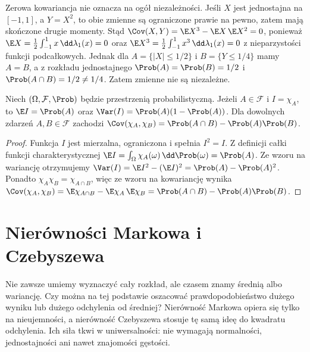 \begin{uwaga}
Zerowa kowariancja nie oznacza na ogół niezależności.
Jeśli $X$ jest jednostajna na $[-1,1]$, a $Y=X^2$, to
obie zmienne są ograniczone prawie na pewno, zatem mają
skończone drugie momenty. Stąd
$\Cov(X,Y)=\E X^3-\E X\,\E X^2=0$,
ponieważ $\E X=\frac12\int_{-1}^1 x\,\dd\lambda_1(x)=0$
oraz $\E X^3=\frac12\int_{-1}^1 x^3\,\dd\lambda_1(x)=0$
z nieparzystości funkcji podcałkowych.
Jednak dla $A=\{|X|\leq1/2\}$ i $B=\{Y\leq1/4\}$
mamy $A=B$, a z rozkładu jednostajnego
$\Prob(A)=\Prob(B)=1/2$ i $\Prob(A\cap B)=1/2\neq1/4$.
Zatem zmienne nie są niezależne.
\end{uwaga}

\begin{stwierdzenie}
Niech $(\Omega,\mathcal F,\Prob)$ będzie przestrzenią
probabilistyczną. Jeżeli $A\in\mathcal F$ i $I=\chi_A$, to
$\E I=\Prob(A)$ oraz
$\Var(I)=\Prob(A)(1-\Prob(A))$.
Dla dowolnych zdarzeń $A,B\in\mathcal F$ zachodzi
$\Cov(\chi_A,\chi_B)=\Prob(A\cap B)-\Prob(A)\Prob(B)$.
\end{stwierdzenie}
\begin{proof}
Funkcja $I$ jest mierzalna, ograniczona i spełnia $I^2=I$.
Z definicji całki funkcji charakterystycznej
$\E I=\int_\Omega\chi_A(\omega)\,\dd\Prob(\omega)=\Prob(A)$.
Ze wzoru na wariancję otrzymujemy
$\Var(I)=\E I^2-(\E I)^2=\Prob(A)-\Prob(A)^2$.
Ponadto $\chi_A\chi_B=\chi_{A\cap B}$, więc ze wzoru
na kowariancję wynika
$\Cov(\chi_A,\chi_B)=\E\chi_{A\cap B}-\E\chi_A\,\E\chi_B
=\Prob(A\cap B)-\Prob(A)\Prob(B)$.
\end{proof}

\section{Nierówności Markowa i Czebyszewa}
Nie zawsze umiemy wyznaczyć cały rozkład, ale czasem znamy
średnią albo wariancję. Czy można na tej podstawie oszacować
prawdopodobieństwo dużego wyniku lub dużego odchylenia od średniej?
Nierówność Markowa opiera się tylko na nieujemności, a nierówność
Czebyszewa stosuje tę samą ideę do kwadratu odchylenia.
Ich siła tkwi w uniwersalności: nie wymagają normalności,
jednostajności ani nawet znajomości gęstości.

